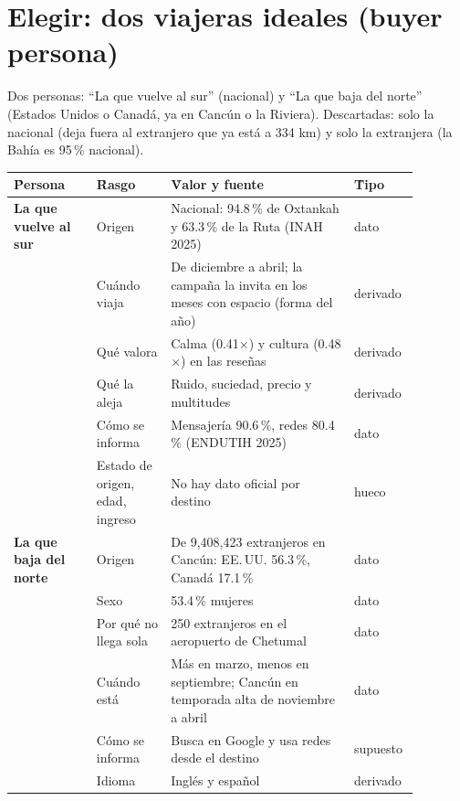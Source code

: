 \section{Elegir: dos viajeras ideales (buyer persona)}
\begin{decision}
Dos personas: ``La que vuelve al sur'' (nacional) y ``La que baja del norte'' (Estados Unidos o Canadá, ya en Cancún o la
Riviera). Descartadas: solo la nacional (deja fuera al extranjero que ya está a 334 km) y solo la extranjera (la Bahía es
95\,\% nacional).
\end{decision}

\small
\begin{longtable}{P{0.19\linewidth}P{0.17\linewidth}P{0.42\linewidth}P{0.1\linewidth}}
\h{Persona} & \h{Rasgo} & \h{Valor y fuente} & \h{Tipo} \\ \endhead
\textbf{La que vuelve al sur} & Origen & Nacional: 94.8\,\% de Oxtankah y 63.3\,\% de la Ruta (INAH 2025) & dato \\
 & Cuándo viaja & De diciembre a abril; la campaña la invita en los meses con espacio (forma del año) & derivado \\
 & Qué valora & Calma (0.41$\times$) y cultura (0.48$\times$) en las reseñas & derivado \\
 & Qué la aleja & Ruido, suciedad, precio y multitudes & derivado \\
 & Cómo se informa & Mensajería 90.6\,\%, redes 80.4\,\% (ENDUTIH 2025) & dato \\
 & Estado de origen, edad, ingreso & No hay dato oficial por destino & hueco \\
\textbf{La que baja del norte} & Origen & De 9,408,423 extranjeros en Cancún: EE.\,UU. 56.3\,\%, Canadá 17.1\,\% & dato \\
 & Sexo & 53.4\,\% mujeres & dato \\
 & Por qué no llega sola & 250 extranjeros en el aeropuerto de Chetumal & dato \\
 & Cuándo está & Más en marzo, menos en septiembre; Cancún en temporada alta de noviembre a abril & dato \\
 & Cómo se informa & Busca en Google y usa redes desde el destino & supuesto \\
 & Idioma & Inglés y español & derivado \\
\end{longtable}
\normalsize

